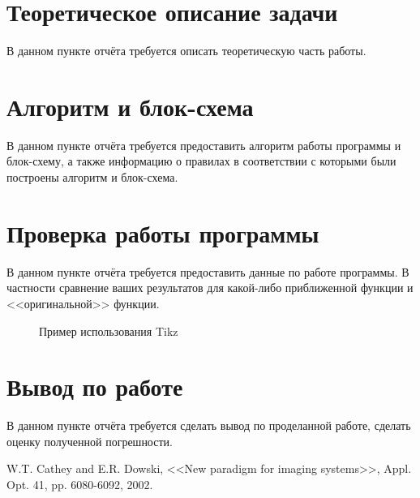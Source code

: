 \documentclass[a4paper,14pt]{extarticle}
\begin{document}
\section{Теоретическое описание задачи}
В данном пункте отчёта требуется описать теоретическую часть работы.

\section{Алгоритм и блок-схема}
В данном пункте отчёта требуется предоставить алгоритм работы программы и блок-схему, 
а также информацию о правилах в соответствии с которыми были построены алгоритм и 
блок-схема.

\section{Проверка работы программы}
В данном пункте отчёта требуется предоставить данные по работе программы. В частности
сравнение ваших результатов для какой-либо приближенной функции и <<оригинальной>> функции.
\begin{figure}[H]
\centering 
{}
\caption{Пример использования Tikz} 
\end{figure}

\section{Вывод по работе}
В данном пункте отчёта требуется сделать вывод по проделанной работе, 
сделать оценку полученной погрешности.

\renewcommand\bibname{Список литературы}
\begin{thebibliography}{99}
 W.T. Cathey and E.R. Dowski, <<New paradigm for imaging systems>>, Appl. Opt. 41, pp. 6080-6092, 2002.
\end{thebibliography}
\end{document}
